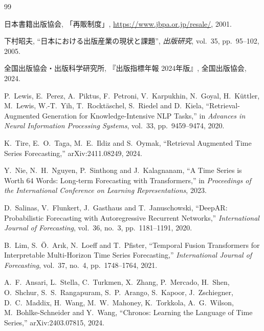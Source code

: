 \documentclass[twocolumn, lastpage]{jarticle}
\begin{document}
\begin{thebibliography}{99}

日本書籍出版協会,
「再販制度」,
\url{https://www.jbpa.or.jp/resale/}, 2001.

下村昭夫,
``日本における出版産業の現状と課題'',
\textit{出版研究}, vol.~35, pp.~95--102, 2005.

全国出版協会・出版科学研究所,
『出版指標年報 2024年版』,
全国出版協会, 2024.

P.~Lewis, E.~Perez, A.~Piktus, F.~Petroni, V.~Karpukhin, N.~Goyal, H.~K\"{u}ttler, M.~Lewis, W.-T.~Yih, T.~Rockt\"{a}schel, S.~Riedel and D.~Kiela,
``Retrieval-Augmented Generation for Knowledge-Intensive {NLP} Tasks,''
in \textit{Advances in Neural Information Processing Systems}, vol.~33, pp.~9459--9474, 2020.

K.~Tire, E.~O.~Taga, M.~E.~Ildiz and S.~Oymak,
``Retrieval Augmented Time Series Forecasting,''
arXiv:2411.08249, 2024.

Y.~Nie, N.~H.~Nguyen, P.~Sinthong and J.~Kalagnanam,
``A Time Series is Worth 64 Words: Long-term Forecasting with Transformers,''
in \textit{Proceedings of the International Conference on Learning Representations}, 2023.

D.~Salinas, V.~Flunkert, J.~Gasthaus and T.~Januschowski,
``{DeepAR}: Probabilistic Forecasting with Autoregressive Recurrent Networks,''
\textit{International Journal of Forecasting}, vol.~36, no.~3, pp.~1181--1191, 2020.

B.~Lim, S.~\"{O}.~Ar{\i}k, N.~Loeff and T.~Pfister,
``Temporal Fusion Transformers for Interpretable Multi-Horizon Time Series Forecasting,''
\textit{International Journal of Forecasting}, vol.~37, no.~4, pp.~1748--1764, 2021.

A.~F.~Ansari, L.~Stella, C.~Turkmen, X.~Zhang, P.~Mercado, H.~Shen, O.~Shchur,
S.~S.~Rangapuram, S.~P.~Arango, S.~Kapoor, J.~Zschiegner, D.~C.~Maddix,
H.~Wang, M.~W.~Mahoney, K.~Torkkola, A.~G.~Wilson, M.~Bohlke-Schneider and Y.~Wang,
``Chronos: Learning the Language of Time Series,''
arXiv:2403.07815, 2024.


\end{thebibliography}
\end{document}
